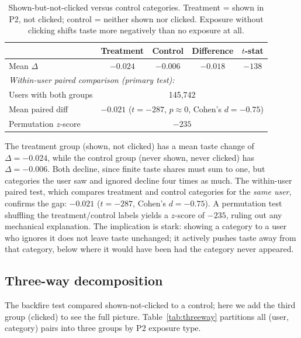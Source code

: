 \documentclass[11pt]{article}
\begin{document}
\begin{table}[ht]
\centering
\caption{Shown-but-not-clicked versus control categories. Treatment = shown in P2, not clicked; control = neither shown nor clicked. Exposure without clicking shifts taste more negatively than no exposure at all.}
\label{tab:backfire}
\begin{tabular}{lcccc}
\toprule
 & Treatment & Control & Difference & $t$-stat \\
\midrule
Mean $\Delta$ & $-0.024$ & $-0.006$ & $-0.018$ & $-138$ \\
\midrule
\multicolumn{5}{l}{\textit{Within-user paired comparison (primary test):}} \\
Users with both groups & \multicolumn{4}{c}{145,742} \\
Mean paired diff & \multicolumn{4}{c}{$-0.021$ ($t = -287$, $p \approx 0$, Cohen's $d = -0.75$)} \\
Permutation $z$-score & \multicolumn{4}{c}{$-235$} \\
\bottomrule
\end{tabular}
\end{table}
\FloatBarrier

The treatment group (shown, not clicked) has a mean taste change of $\Delta = -0.024$, while the control group (never shown, never clicked) has $\Delta = -0.006$. Both decline, since finite taste shares must sum to one, but categories the user saw and ignored decline four times as much. The within-user paired test, which compares treatment and control categories for the \emph{same user}, confirms the gap: $-0.021$ ($t = -287$, Cohen's $d = -0.75$). A permutation test shuffling the treatment/control labels yields a $z$-score of $-235$, ruling out any mechanical explanation. The implication is stark: showing a category to a user who ignores it does not leave taste unchanged; it actively pushes taste away from that category, below where it would have been had the category never appeared.

\subsection{Three-way decomposition}

The backfire test compared shown-not-clicked to a control; here we add the third group (clicked) to see the full picture. Table~\ref{tab:threeway} partitions all (user, category) pairs into three groups by P2 exposure type.
\end{document}
